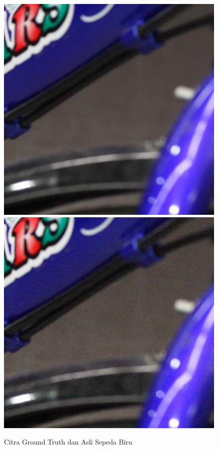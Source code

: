 \documentclass[11pt, a4paper, final]{report}
\begin{document}
\begin{figure}[H]
\centering
\includegraphics[scale=0.34]{assets/BlueMean.JPG}
\includegraphics[scale=0.34]{assets/BlueReal.JPG}
\caption{Citra Ground Truth dan Asli Sepeda Biru \cite{xu2018realworld}}
\end{figure}
\end{document}
